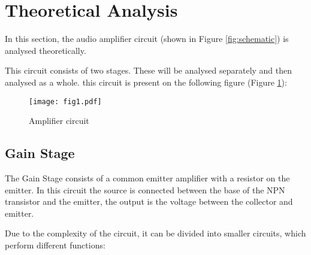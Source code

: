 \section{Theoretical Analysis}
\label{sec:analysis}
\indent


In this section, the audio amplifier circuit (shown in Figure \ref{fig:schematic}) is analysed theoretically.

This circuit consists of two stages. These will be analysed separately and then analysed as a whole. this circuit is present on the following figure (Figure \ref{fig:Circuit}): 

\begin{figure}[h!]
    \centering
    \texttt{[image: fig1.pdf]}
    \caption{Amplifier circuit}
    \label{fig:Circuit}
\end{figure}


\subsection{Gain Stage}

\indent

The Gain Stage consists of a common emitter amplifier with a resistor on the emitter. In this circuit the source is connected between the base of the NPN transistor and the emitter, the output is the voltage between the collector and emitter.

Due to the complexity of the circuit, it can be divided into smaller circuits, which perform different functions:


